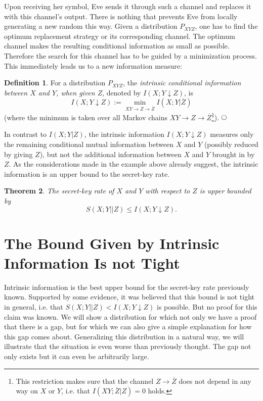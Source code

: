 \documentclass[a4paper, twoside, openany]{report}
\newcommand{\intrivar}[3]{I(#1;#2\!\!\downarrow\!#3)}
\newcommand{\intri}{\intrivar{X}{Y}{Z}}
\newcommand{\srate}{S(X;Y||Z)}
\newcommand{\channel}[2]{#1 \rightarrow #2}
\newcommand{\mchain}[3]{#1 \rightarrow #2 \rightarrow #3}
\newcommand{\ol}[1]{\overline{#1}}
\newcommand{\zol}{\ol{Z}}
\theoremstyle{plain}
\newtheorem{theorem}{Theorem}
\theoremstyle{definition}
\newtheorem{definition}[theorem]{Definition}
\newcommand{\textcirc}{%
  \setlength{\unitlength}{1.5ex}%
  \begin{picture}(1.1,1)(-.55,-.55)%
    \put(0,0){\circle{1.1}}%
  \end{picture}}
\newcommand{\definitionend}{\hspace*{\fill} $\textcirc$}
\begin{document}
Upon receiving her symbol, Eve sends it through such a channel and replaces it with this channel's output. There is nothing that prevents Eve from locally generating a new random this way. Given a distribution $P_{XYZ}$, one has to find the optimum replacement strategy or its corresponding channel. The optimum channel makes the resulting conditional information as small as possible. Therefore the search for this channel has to be guided by a minimization process. This immediately leads us to a new information measure:

\begin{definition} \label{intri} {\bf \cite{ittrans}}
{\rm
For a distribution $P_{XYZ}$, the {\em intrinsic conditional information between $X$ and $Y$, when given $Z$}, denoted by $\intri$, is
\[\intri := \min_{\mchain{XY}{Z}{\zol}} I(X;Y|\zol)\]
(where the minimum is taken over all Markov chains $\mchain{XY}{Z}{\zol}$\footnote{This restriction makes sure that the channel $\channel{Z}{\zol}$ does not depend in any way on $X$ or $Y$, i.e. that $I(XY;\zol|Z) = 0$ holds.}).}
\definitionend
\end{definition}

In contrast to $I(X;Y|Z)$, the intrinsic information $\intri$ measures only the remaining conditional mutual information between $X$ and $Y$ (possibly reduced by giving $Z$), but not the additional information between $X$ and $Y$ brought in by $Z$. As the considerations made in the example above already suggest, the intrinsic information is an upper bound to the secret-key rate.

\begin{theorem} \label{ubnd:intriInfo} {\bf \cite{ittrans}}
The secret-key rate of $X$ and $Y$ with respect to $Z$ is upper bounded by
\[\srate \leq \intri.\]
\end{theorem}


\chapter{The Bound Given by Intrinsic Information Is not Tight} \label{ch:NonTightness}

Intrinsic information is the best upper bound for the secret-key rate previously known. Supported by some evidence, it was believed that this bound is not tight in general, i.e. that $\srate < \intri$ is possible. But no proof for this claim was known. We will show a distribution for which not only we have a proof that there is a gap, but for which we can also give a simple explanation for how this gap comes about. Generalizing this distribution in a natural way, we will illustrate that the situation is even worse than previously thought. The gap not only exists but it can even be arbitrarily large.
\end{document}
